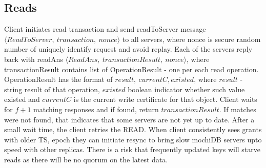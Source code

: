 \documentclass[letterpaper,twocolumn,10pt]{article}
\begin{document}
\subsection{Reads}
Client initiates read transaction and send readToServer message $\langle ReadToServer,\ transaction,\ nonce \rangle$ to all servers, where nonce is secure random number of uniquely identify request and avoid replay. Each of the servers reply back with readAns $\langle ReadAns,\ transactionResult,\ nonce \rangle$, where transactionResult contains list of OperationResult - one per each read operation. OperationResult has the format of ${result,\ currentC, existed}$, where $result$ - string result of that operation, $existed$ boolean indicator whether such value existed and $currentC$ is the current write certificate for that object.
Client waits for $f+1$ matching responses and if found, return $transactionResult$. If matches were not found, that indicates that some servers are not yet up to date. After a small wait time, the client retries the READ. When client consistently sees grants with older TS, epoch they can initiate resync to bring slow mochiDB servers upto speed with other replicas. There is a risk that frequently updated keys will starve reads as there will be no quorum on the latest data. 
\end{document}
